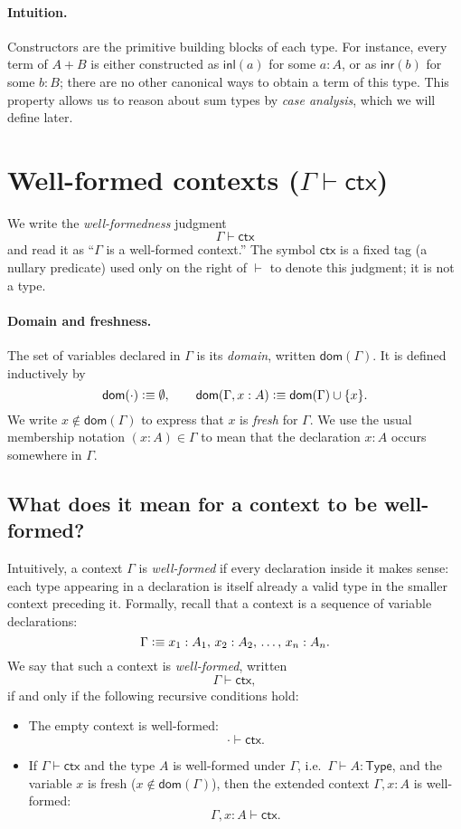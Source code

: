 \documentclass{article}
\newcommand{\Type}{\mathsf{Type}}
\newcommand{\defeq}{\vcentcolon\equiv}
\newcommand{\inl}{\mathsf{inl}}
\newcommand{\inr}{\mathsf{inr}}
\newcommand{\emptyctx}{\cdot}              %
\newcommand{\ctx}{\mathsf{ctx}}            %
\newcommand{\judg}[3]{#1 \vdash #2 : #3}   %
\newcommand{\dom}{\mathsf{dom}}            %
\begin{document}
\paragraph{Intuition.}
Constructors are the primitive building blocks of each type.  
For instance, every term of \(A + B\) is either constructed as \(\inl(a)\) for some \(a : A\), or as \(\inr(b)\) for some \(b : B\); there are no other canonical ways to obtain a term of this type.  
This property allows us to reason about sum types by \emph{case analysis}, which we will define later.

\section{Well-formed contexts \texorpdfstring{(\(\Gamma \vdash \ctx\))}{(Gamma |- ctx)}}

We write the \emph{well-formedness} judgment
\[
\Gamma \vdash \ctx
\]
and read it as “\(\Gamma\) is a well-formed context.” The symbol \(\ctx\) is a
fixed tag (a nullary predicate) used only on the right of \(\vdash\) to denote
this judgment; it is not a type.

\paragraph{Domain and freshness.}
The set of variables declared in \(\Gamma\) is its \emph{domain}, written
\(\dom(\Gamma)\). It is defined inductively by
\[
\dom(\emptyctx) \defeq \emptyset,
\qquad
\dom(\Gamma, x:A) \defeq \dom(\Gamma) \cup \{x\}.
\]
We write \(x \notin \dom(\Gamma)\) to express that \(x\) is \emph{fresh} for \(\Gamma\).
We use the usual membership notation \((x:A)\in\Gamma\) to mean that the
declaration \(x:A\) occurs somewhere in \(\Gamma\).

\subsection*{What does it mean for a context to be well-formed?}

Intuitively, a context \(\Gamma\) is \emph{well-formed} if every declaration inside it makes sense:  
each type appearing in a declaration is itself already a valid type in the smaller context preceding it. Formally, recall that a context is a sequence of variable declarations:
\[
\Gamma \defeq x_1 : A_1,\, x_2 : A_2,\, \dots,\, x_n : A_n.
\]
We say that such a context is \emph{well-formed}, written
\[
\Gamma \vdash \ctx,
\]
if and only if the following recursive conditions hold:
\begin{itemize}
  \item The empty context is well-formed:
    \[
    \emptyctx \vdash \ctx.
    \]
  \item If \(\Gamma \vdash \ctx\) and the type \(A\) is well-formed under \(\Gamma\),
    i.e.\ \(\judg{\Gamma}{A}{\Type}\), and the variable \(x\) is fresh
    (\(x \notin \dom(\Gamma)\)),  
    then the extended context \(\Gamma, x:A\) is well-formed:
    \[
    \Gamma, x:A \vdash \ctx.
    \]
\end{itemize}
\end{document}
